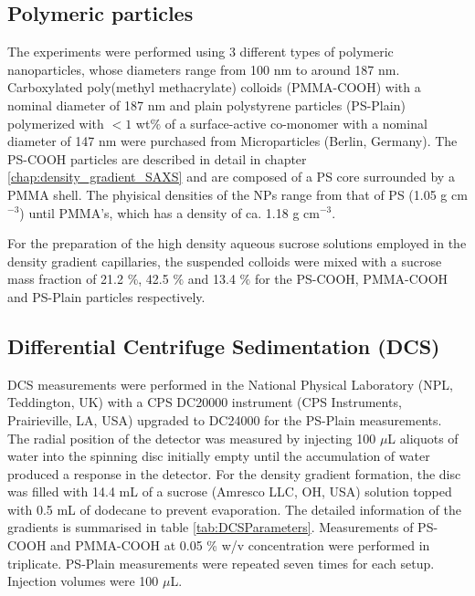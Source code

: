 \subsection{Polymeric particles}

The experiments were performed using 3 different types of polymeric nanoparticles, whose diameters range from 100 nm to around 187 nm. Carboxylated poly(methyl methacrylate) colloids (PMMA-COOH) with a nominal diameter of 187 nm and plain polystyrene particles (PS-Plain) polymerized with $<1$ wt$\%$ of a surface-active co-monomer with a nominal diameter of 147 nm were purchased from Microparticles (Berlin, Germany). The PS-COOH particles are described in detail in chapter \ref{chap:density_gradient_SAXS} and are composed of a PS core surrounded by a PMMA shell. The phyisical densities of the NPs range from that of PS (1.05 g cm$^{-3}$) until PMMA's, which has a density of ca. 1.18 g cm$^{-3}$.

For the preparation of the high density aqueous sucrose solutions employed in the density gradient capillaries, the suspended colloids were mixed with a sucrose mass fraction of 21.2 $\%$, 42.5 $\%$ and 13.4 $\%$ for the PS-COOH, PMMA-COOH and PS-Plain particles respectively.


\subsection{Differential Centrifuge Sedimentation (DCS)}
\label{sec:DCS_experimental}
DCS measurements were performed in the National Physical Laboratory (NPL, Teddington, UK) with a CPS DC20000 instrument (CPS Instruments, Prairieville, LA, USA) upgraded to DC24000 for the PS-Plain measurements. The radial position of the detector was measured by injecting 100 $\mu$L aliquots of water into the spinning disc initially empty until the accumulation of water produced a response in the detector. For the density gradient formation, the disc was filled with 14.4 mL of a sucrose (Amresco LLC, OH, USA) solution topped with 0.5 mL of dodecane to prevent evaporation. The detailed information of the gradients is summarised in table \ref{tab:DCSParameters}. Measurements of PS-COOH and PMMA-COOH at 0.05 \% w/v concentration were performed in triplicate. PS-Plain measurements were repeated seven times for each setup. Injection volumes were 100 $\mu$L. 

